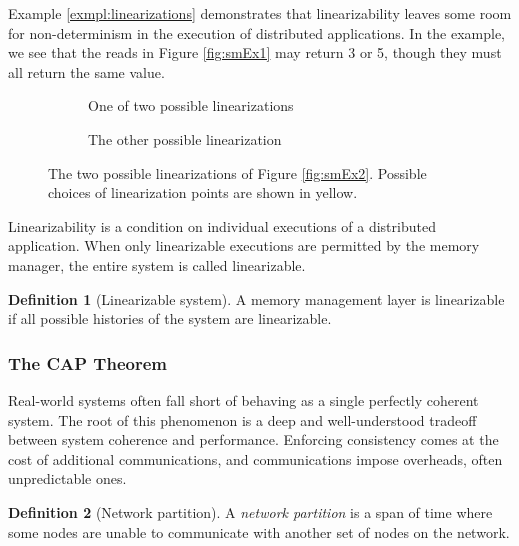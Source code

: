 \documentclass[]             %
{NASA}                       %
\theoremstyle{definition}
\newtheorem{definition}{Definition}[section]
\begin{document}
Example \ref{exmpl:linearizations} demonstrates that linearizability
leaves some room for non-determinism in the execution of distributed
applications. In the example, we see that the reads in Figure
\ref{fig:smEx1} may return 3 or 5, though they must all return the
same value.
\begin{figure}[p]
  \setlength\belowcaptionskip{5ex}

  \begin{subfigure}{1\textwidth}
    \centering
    
    \caption{One of two possible linearizations}
    \label{fig:smEx1L1}
  \end{subfigure}

  \begin{subfigure}{1\textwidth}
    
    \caption{The other possible linearization}
    \label{fig:smEx3L2}
  \end{subfigure}

  \caption{The two possible linearizations of Figure \ref{fig:smEx2}. Possible choices of linearization points are shown in yellow.}
  \label{fig:smEx3}
\end{figure}
\afterpage{\clearpage}

Linearizability is a condition on individual executions of a
distributed application. When only linearizable executions are
permitted by the memory manager, the entire system is called
linearizable.

\begin{definition}[Linearizable system]
  A memory management layer is linearizable if all possible histories
  of the system are linearizable.
\end{definition}

\subsubsection{The CAP Theorem}
Real-world systems often fall short of behaving as a single perfectly
coherent system. The root of this phenomenon is a deep and
well-understood tradeoff between system coherence and performance.
Enforcing consistency comes at the cost of additional communications,
and communications impose overheads, often unpredictable ones.

\begin{definition}[Network partition]
  A \emph{network partition} is a span of time where some nodes are
  unable to communicate with another set of nodes on the network.
\end{definition}
\end{document}
